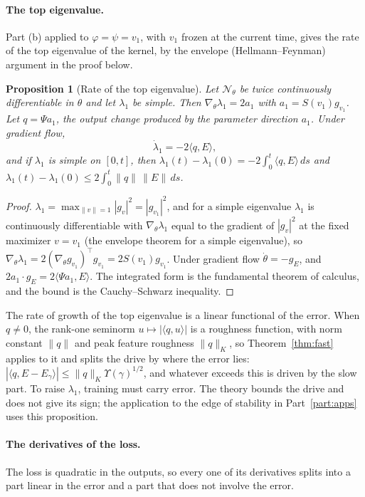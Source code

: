 \documentclass[11pt]{article}
\newtheorem{proposition}{Proposition}
\theoremstyle{definition}
\theoremstyle{remark}
\newcommand{\Net}{\mathcal{N}_\theta}    %
\newcommand{\ip}[2]{\langle #1,#2\rangle}
\begin{document}
\paragraph{The top eigenvalue.}
Part (b) applied to $\varphi = \psi = v_1$, with $v_1$ frozen at the current time, gives the rate of the top eigenvalue of the kernel, by the envelope (Hellmann--Feynman) argument in the proof below.

\begin{proposition}[Rate of the top eigenvalue]\label{prop:lambda1}
Let $\Net$ be twice continuously differentiable in $\theta$ and let $\lambda_1$ be simple.
Then $\nabla_\theta\lambda_1 = 2a_1$ with $a_1 = S(v_1)g_{v_1}$.
Let $q = \Psi a_1$, the output change produced by the parameter direction $a_1$.
Under gradient flow,
\begin{equation}\label{eq:lambda1dot}
\dot\lambda_1 = -2\ip{q}{E},
\end{equation}
and if $\lambda_1$ is simple on $[0,t]$, then $\lambda_1(t) - \lambda_1(0) = -2\int_0^t\ip{q}{E}\,ds$ and $\lambda_1(t) - \lambda_1(0)\le2\int_0^t\|q\|\,\|E\|\,ds$.
\end{proposition}

\begin{proof}
$\lambda_1 = \max_{\|v\|=1}|g_v|^2 = |g_{v_1}|^2$, and for a simple eigenvalue $\lambda_1$ is continuously differentiable with $\nabla_\theta\lambda_1$ equal to the gradient of $|g_v|^2$ at the fixed maximizer $v = v_1$ (the envelope theorem for a simple eigenvalue), so $\nabla_\theta\lambda_1 = 2(\nabla_\theta g_{v_1})^\top g_{v_1} = 2S(v_1)g_{v_1}$.
Under gradient flow $\dot\theta = -g_E$, and $2a_1\cdot g_E = 2\ip{\Psi a_1}{E}$.
The integrated form is the fundamental theorem of calculus, and the bound is the Cauchy--Schwarz inequality.
\end{proof}

The rate of growth of the top eigenvalue is a linear functional of the error.
When $q\neq0$, the rank-one seminorm $u\mapsto|\ip{q}{u}|$ is a roughness function, with norm constant $\|q\|$ and peak feature roughness $\|q\|_K$, so Theorem~\ref{thm:fast} applies to it and splits the drive by where the error lies: $|\ip{q}{E - E_\gamma}|\le\|q\|_K\Upsilon(\gamma)^{1/2}$, and whatever exceeds this is driven by the slow part.
To raise $\lambda_1$, training must carry error.
The theory bounds the drive and does not give its sign; the application to the edge of stability in Part~\ref{part:apps} uses this proposition.

\paragraph{The derivatives of the loss.}
The loss is quadratic in the outputs, so every one of its derivatives splits into a part linear in the error and a part that does not involve the error.
\end{document}
